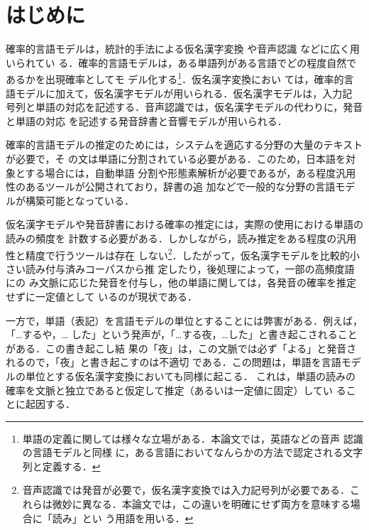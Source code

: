 \documentclass[japanese]{jnlp_JS2.0}
\begin{document}
\maketitle

\section{はじめに}

確率的言語モデルは，統計的手法による仮名漢字変換
\cite{確率的モデルによる仮名漢字変換} \cite{Google.IME} 
\cite{漢字かなのＴＲＩＧＲＡＭをもちいたかな漢字変換方法}
や音声認識\cite{音声認識システム} \cite{Self-Organized.Language.Modeling.for.Speech.Recognition}などに広く用いられてい
る．確率的言語モデルは，ある単語列がある言語でどの程度自然であるかを出現確率としてモ
デル化する\footnote{単語の定義に関しては様々な立場がある．本論文では，英語などの音声
認識の言語モデル\cite{Self-Organized.Language.Modeling.for.Speech.Recognition}と同様
に，ある言語においてなんらかの方法で認定される文字列と定義する．}．仮名漢字変換におい
ては，確率的言語モデルに加えて，仮名漢字モデルが用いられる．仮名漢字モデルは，入力記
号列と単語の対応を記述する．音声認識では，仮名漢字モデルの代わりに，発音と単語の対応
を記述する発音辞書と音響モデルが用いられる．

確率的言語モデルの推定のためには，システムを適応する分野の大量のテキストが必要で，そ
の文は単語に分割されている必要がある．このため，日本語を対象とする場合には，自動単語
分割や形態素解析が必要であるが，ある程度汎用性のあるツールが公開されており，辞書の追
加などで一般的な分野の言語モデルが構築可能となっている．

仮名漢字モデルや発音辞書における確率の推定には，実際の使用における単語の読みの頻度を
計数する必要がある．しかしながら，読み推定をある程度の汎用性と精度で行うツールは存在
しない\footnote{音声認識では発音が必要で，仮名漢字変換では入力記号列が必要である．こ
れらは微妙に異なる．本論文では，この違いを明確にせず両方を意味する場合に「読み」とい
う用語を用いる．}．したがって，仮名漢字モデルを比較的小さい読み付与済みコーパスから推
定したり\cite{確率的モデルによる仮名漢字変換}，後処理によって，一部の高頻度語にの
み文脈に応じた発音を付与し，他の単語に関しては，各発音の確率を推定せずに一定値として
いる\cite{音声認識システム}のが現状である．



一方で，単語（表記）を言語モデルの単位とすることには弊害がある．例えば，「…するや，…
した」という発声が，「…する夜，…した」と書き起こされることがある．この書き起こし結
果の「夜」は，この文脈では必ず「よる」と発音されるので，「夜」と書き起こすのは不適切
である．この問題は，単語を言語モデルの単位とする仮名漢字変換においても同様に起こる．
これは，単語の読みの確率を文脈と独立であると仮定して推定（あるいは一定値に固定）してい
ることに起因する．
\end{document}
